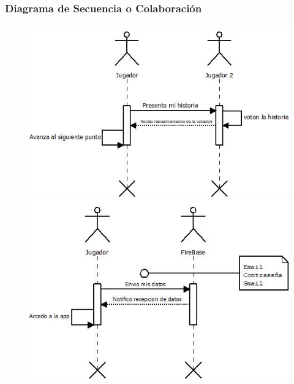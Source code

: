 \subsubsection{Diagrama de Secuencia o Colaboración}
\begin{figure}[H]
   \includegraphics[scale=0.6]{imgs/DS_1.jpeg}
   \includegraphics[scale=0.6]{imgs/DS_2.jpeg}
\end{figure}

